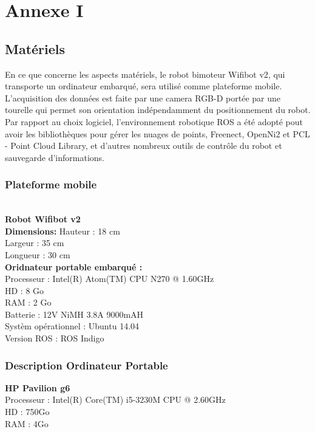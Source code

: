 \chapter{Annexe I}

\section{Matériels}

En ce que concerne les aspects matériels, le robot bimoteur Wifibot v2, qui transporte un ordinateur embarqué, sera utilisé comme plateforme mobile. L'acquisition des données est faite par une camera RGB-D portée par une tourelle qui permet son orientation indépendamment du positionnement du robot.
Par rapport au choix logiciel, l'environnement robotique ROS a été adopté pout avoir les bibliothèques pour gérer les nuages de points, Freenect, OpenNi2 et PCL - Point Cloud Library, et d'autres nombreux outils de contrôle du robot et sauvegarde d'informations.

\subsection{ Plateforme mobile } \\

\large{\textbf{Robot Wifibot v2}} \\
\textbf{Dimensions:}
Hauteur : 18 cm \\
Largeur : 35 cm \\
Longueur : 30 cm \\

\textbf{Oridnateur portable embarqué : } \\
Processeur : Intel(R) Atom(TM) CPU N270   @ 1.60GHz \\
HD : 8 Go \\
RAM : 2 Go \\
Batterie : 12V NiMH 3.8A 9000mAH \\

Systèm opérationnel : Ubuntu 14.04 \\
Version ROS : ROS Indigo \\ 

\subsection{Description Ordinateur Portable}

\textbf{HP Pavilion g6} \\
Processeur :  Intel(R) Core(TM) i5-3230M CPU @ 2.60GHz \\
HD : 750Go \\
RAM : 4Go \\

